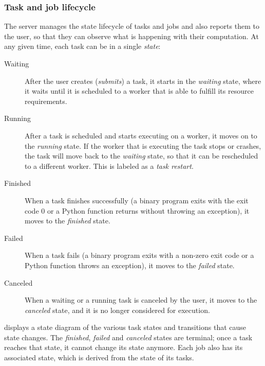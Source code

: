\subsubsection{Task and job lifecycle}
The server manages the state lifecycle of tasks and jobs and also reports them to the user, so that
they can observe what is happening with their computation. At any given time, each task can be in a
single \emph{state}:

\begin{description}
	\item[Waiting] After the user creates (\emph{submits}) a task, it starts in the \emph{waiting}
		state, where it waits until it is scheduled to a worker that is able to fulfill its resource
		requirements.
	\item[Running] After a task is scheduled and starts executing on a worker, it moves on to the
		\emph{running} state. If the worker that is executing the task stops or crashes, the task
		will move back to the \emph{waiting} state, so that it can be rescheduled to a different
		worker. This is labeled as a \emph{task restart}.
	\item[Finished] When a task finishes successfully (a binary program exits with the exit code $0$
		or a Python function returns without throwing an exception), it moves to the \emph{finished}
		state.
	\item[Failed] When a task fails (a binary program exits with a non-zero exit code or a Python function throws an
		exception), it moves to the \emph{failed} state.
	\item[Canceled] When a waiting or a running task is canceled by the user, it moves to the \emph{canceled}
		state, and it is no longer considered for execution.
\end{description}

 displays a state diagram of the various task states and
transitions that cause state changes. The \emph{finished}, \emph{failed} and
\emph{canceled} states are terminal; once a task reaches that state, it cannot change its
state anymore. Each job also has its associated state, which is derived from the state of its
tasks.

